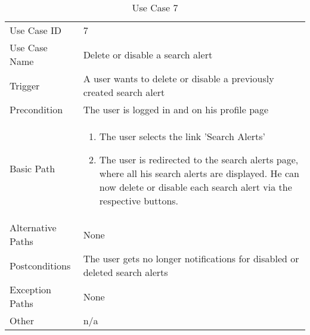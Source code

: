 \begin{table}[H]
\centering
\label{table-use-case-7}
\begin{tabular}{|p{3cm}|p{10cm}}
Use Case ID       & 7                                                         \\
Use Case Name     & Delete or disable a search alert                                      \\
Trigger           & A user wants to delete or disable a previously created search alert	\\
Precondition      & The user is logged in and on his profile page               \\
Basic Path        & \begin{enumerate}
\item The user selects the link 'Search Alerts'
\item The user is redirected to the search alerts page, where all his search
alerts are displayed. He can now delete or disable each search alert via the
respective buttons. 
\end{enumerate} 
     \\
Alternative Paths & None                          \\
Postconditions    & The user gets no longer notifications for disabled or deleted search alerts		\\
Exception Paths   & None			\\
Other             & n/a                                                                                                                                                                                                        
\end{tabular}
\caption{Use Case 7}
\end{table}

